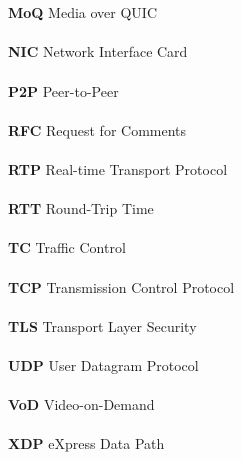 \begin{tabbing}
    \\\\\textbf{MoQ} \> Media over QUIC
    \\\\\textbf{NIC} \> Network Interface Card
    \\\\\textbf{P2P} \> Peer-to-Peer
    \\\\\textbf{RFC} \> Request for Comments
    \\\\\textbf{RTP} \> Real-time Transport Protocol
    \\\\\textbf{RTT} \> Round-Trip Time
    \\\\\textbf{TC} \> Traffic Control
    \\\\\textbf{TCP} \> Transmission Control Protocol
    \\\\\textbf{TLS} \> Transport Layer Security
    \\\\\textbf{UDP} \> User Datagram Protocol
    \\\\\textbf{VoD} \> Video-on-Demand
    \\\\\textbf{XDP} \> eXpress Data Path
\end{tabbing}


